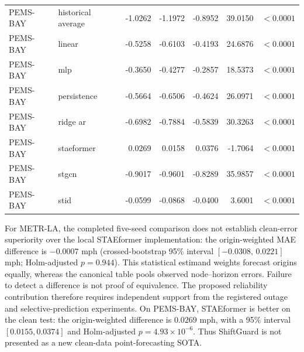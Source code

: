 \documentclass[pdflatex,sn-mathphys-num]{sn-jnl}
\begin{document}
\begin{table}[t]
{\begin{tabular}{llrrrrl}
PEMS-BAY & historical average & -1.0262 & -1.1972 & -0.8952 & 39.0150 & $<0.0001$ \\
PEMS-BAY & linear & -0.5258 & -0.6103 & -0.4193 & 24.6876 & $<0.0001$ \\
PEMS-BAY & mlp & -0.3650 & -0.4277 & -0.2857 & 18.5373 & $<0.0001$ \\
PEMS-BAY & persistence & -0.5664 & -0.6506 & -0.4624 & 26.0971 & $<0.0001$ \\
PEMS-BAY & ridge ar & -0.6982 & -0.7884 & -0.5839 & 30.3263 & $<0.0001$ \\
PEMS-BAY & staeformer & 0.0269 & 0.0158 & 0.0376 & -1.7064 & $<0.0001$ \\
PEMS-BAY & stgcn & -0.9017 & -0.9601 & -0.8289 & 35.9857 & $<0.0001$ \\
PEMS-BAY & stid & -0.0599 & -0.0868 & -0.0400 & 3.6001 & $<0.0001$ \\
\bottomrule
\end{tabular}}
\end{table}

For METR-LA, the completed five-seed comparison does not establish clean-error
superiority over the local STAEformer implementation: the origin-weighted MAE
difference is $-0.0007$ mph (crossed-bootstrap 95\% interval
$[-0.0308,\,0.0221]$ mph; Holm-adjusted $p=0.944$). This statistical estimand
weights forecast origins equally, whereas the canonical table pools observed
node--horizon errors. Failure to detect a difference is not proof of equivalence.
The proposed reliability contribution therefore requires independent support
from the registered outage and selective-prediction experiments.
On PEMS-BAY, STAEformer is better on the clean test: the origin-weighted
difference is $0.0269$ mph, with a 95\% interval $[0.0155,0.0374]$ and
Holm-adjusted $p=4.93\times10^{-6}$. Thus ShiftGuard is not presented as a new
clean-data point-forecasting SOTA.
\end{document}
